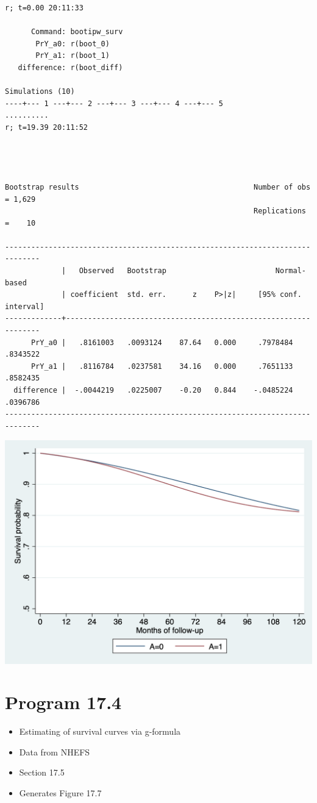 \documentclass[
  10pt,
  a4paper,
]{book}
\providecommand{\tightlist}{%
  \setlength{\itemsep}{0pt}\setlength{\parskip}{0pt}}
\begin{document}
\begin{verbatim}
r; t=0.00 20:11:33

      Command: bootipw_surv
       PrY_a0: r(boot_0)
       PrY_a1: r(boot_1)
   difference: r(boot_diff)

Simulations (10)
----+--- 1 ---+--- 2 ---+--- 3 ---+--- 4 ---+--- 5 
..........
r; t=19.39 20:11:52




Bootstrap results                                        Number of obs = 1,629
                                                         Replications  =    10

------------------------------------------------------------------------------
             |   Observed   Bootstrap                         Normal-based
             | coefficient  std. err.      z    P>|z|     [95% conf. interval]
-------------+----------------------------------------------------------------
      PrY_a0 |   .8161003   .0093124    87.64   0.000     .7978484    .8343522
      PrY_a1 |   .8116784   .0237581    34.16   0.000     .7651133    .8582435
  difference |  -.0044219   .0225007    -0.20   0.844    -.0485224    .0396786
------------------------------------------------------------------------------
\end{verbatim}

\begin{center}\includegraphics[width=0.85\linewidth]{./figs/stata-fig-17-3} \end{center}

\hypertarget{program-17.4-1}{%
\section{Program 17.4}\label{program-17.4-1}}

\begin{itemize}
\tightlist
\item
  Estimating of survival curves via g-formula
\item
  Data from NHEFS
\item
  Section 17.5
\item
  Generates Figure 17.7
\end{itemize}
\end{document}
